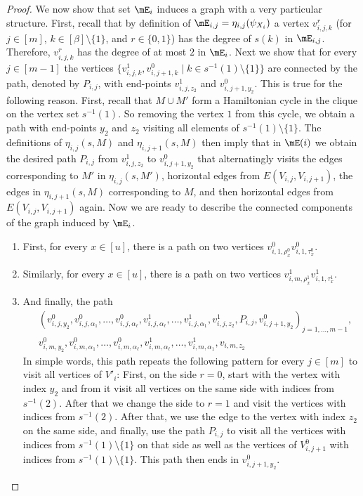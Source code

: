 \documentclass[a4paper,UKenglish,cleveref, autoref, thm-restate]{lipics-v2021}
\begin{document}
\begin{proof}
	We now show that set $\mE_i$ induces a graph with a very particular structure.
	First, recall that by definition of $\mE_{i,j} = \eta_{i,j}(\psi_{X_i})$ a vertex $v_{i, j, k}^r$ (for $j \in [m]$, $k \in [\beta] \setminus \{1\}$, and $r \in \{0, 1\}$) has the degree of $s(k)$ in $\mE_{i,j}$.
	Therefore, $v_{i,j,k}^r$ has the degree of at most $2$ in $\mE_i$.
	Next we show that for every $j \in [m-1]$ the vertices $\{v_{i,j,k}^1, v_{i,j+1,k}^0 \mid k \in s^{-1}(1) \setminus \{1\}\}$ are connected by the path, denoted by $P_{i,j}$, with end-points $v_{i,j,z_2}^1$ and $v_{i,j+1,y_2}^0$. 
	This is true for the following reason.
	First, recall that $M \cup M'$ form a Hamiltonian cycle in the clique on the vertex set $s^{-1}(1)$. 
	So removing the vertex $1$ from this cycle, we obtain a path with end-points $y_2$ and $z_2$ visiting all elements of $s^{-1}(1) \setminus \{1\}$.
	The definitions of $\eta_{i,j}(s,M)$ and $\eta_{i,j+1}(s,M)$ then imply that in $\mE(i)$ we obtain the desired path $P_{i,j}$ from $v_{i,j,z_2}^1$ to $v_{i,j+1,y_2}^0$ that alternatingly visits the edges corresponding to $M'$ in $\eta_{i,j}(s,M')$, horizontal edges from $E(V_{i,j}, V_{i,j+1})$, the edges in $\eta_{i,j+1}(s,M)$ corresponding to $M$, and then horizontal edges from $E(V_{i,j}, V_{i,j+1})$ again.
	Now we are ready to describe the connected components of the graph induced by $\mE_i$.
	\begin{enumerate}
	 \item First, for every $x \in [u]$, there is a path on two vertices $v_{i,1,\rho_x^0}^0 v_{i,1,\tau_x^0}^0$.
	 \item Similarly, for every $x \in [u]$, there is a path on two vertices $v_{i,m,\rho_x^1}^1 v_{i,1,\tau_x^1}^1$.
	 \item And finally, the path 
	 \begin{align*}
	  &(v_{i,j,y_2}^0, v_{i,j,\alpha_1}^0, \dots, v_{i,j,\alpha_\ell}^0, v_{i,j,\alpha_\ell}^1, \dots, v_{i,j,\alpha_1}^1, v_{i,j,z_2}^1, P_{i,j}, v_{i,j+1,y_2}^0)_{j = 1, \dots, m-1}, \\
	  &v_{i,m,y_2}^0, v_{i,m,\alpha_1}^0, \dots, v_{i,m,\alpha_\ell}^0, v_{i,m,\alpha_\ell}^1, \dots, v_{i,m,\alpha_1}^1, v_{i,m,z_2}
	 \end{align*}
	 In simple words, this path repeats the following pattern for every $j \in [m]$ to visit all vertices of $V'_i$: 
	 First, on the side $r = 0$, start with the vertex with index $y_2$ and from it visit all vertices on the same side with indices from $s^{-1}(2)$.
	 After that we change the side to $r=1$ and visit the vertices with indices from $s^{-1}(2)$.
	 After that, we use the edge to the vertex with index $z_2$ on the same side, and finally, use the path $P_{i,j}$ to visit all the vertices with indices from $s^{-1}(1)\setminus \{1\}$ on that side as well as the vertices of $V_{i,j+1}^0$ with indices from $s^{-1}(1)\setminus \{1\}$.
	 This path then ends in $v_{i,j+1,y_2}^0$.
	\end{enumerate}
	

\end{proof}
\end{document}
